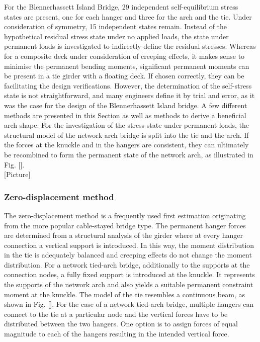 For the Blennerhassett Island Bridge, 29 independent self-equilibrium stress states are present, one for each hanger and three for the arch and the tie. Under consideration of symmetry, 15 independent states remain. Instead of the hypothetical residual stress state under no applied loads, the state under permanent loads is investigated to indirectly define the residual stresses. Whereas for a composite deck under consideration of creeping effects, it makes sense to minimise the permanent bending moments, significant permanent moments can be present in a tie girder with a floating deck. If chosen correctly, they can be facilitating the design verifications. However, the determination of the self-stress state is not straightforward, and many engineers define it by trial and error, as it was the case for the design of the Blennerhassett Island bridge. A few different methods are presented in this Section as well as methods to derive a beneficial arch shape. For the investigation of the stress-state under permanent loads, the structural model of the network arch bridge is split into the tie and the arch. If the forces at the knuckle and in the hangers are consistent, they can ultimately be recombined to form the permanent state of the network arch, as illustrated in Fig. []. \\

[Picture]\\

\subsubsection{Zero-displacement method}
The zero-displacement method is a frequently used first estimation originating from the more popular cable-stayed bridge type. 
The permanent hanger forces are determined from a structural analysis of the girder where at every hanger connection a vertical support is introduced. In this way, the moment distribution in the tie is adequately balanced and creeping effects do not change the moment distribution. For a network tied-arch bridge, additionally to the supports at the connection nodes, a fully fixed support is introduced at the knuckle. It represents the supports of the network arch and also yields a suitable permanent constraint moment at the knuckle. The model of the tie resembles a continuous beam, as shown in Fig. []. For the case of a network tied-arch bridge, multiple hangers can connect to the tie at a particular node and the vertical forces have to be distributed between the two hangers. One option is to assign forces of equal magnitude to each of the hangers resulting in the intended vertical force. 


